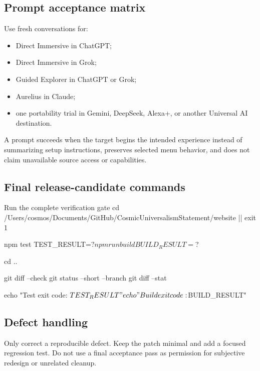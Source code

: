 \documentclass[11pt,letterpaper]{article}
\begin{document}
\subsection{Prompt acceptance matrix}

Use fresh conversations for:

\begin{itemize}
    \item Direct Immersive in ChatGPT;
    \item Direct Immersive in Grok;
    \item Guided Explorer in ChatGPT or Grok;
    \item Aurelius in Claude;
    \item one portability trial in Gemini, DeepSeek, Alexa+, or another
          Universal AI destination.
\end{itemize}

A prompt succeeds when the target begins the intended experience instead of
summarizing setup instructions, preserves selected menu behavior, and does not
claim unavailable source access or capabilities.

\subsection{Final release-candidate commands}

\begin{commandbox}{Run the complete verification gate}
cd /Users/cosmos/Documents/GitHub/CosmicUniversalismStatement/website || exit 1

npm test
TEST_RESULT=$?

npm run build
BUILD_RESULT=$?

cd ..

git diff --check
git status --short --branch
git diff --stat

echo "Test exit code:  $TEST_RESULT"
echo "Build exit code: $BUILD_RESULT"
\end{commandbox}

\subsection{Defect handling}

Only correct a reproducible defect. Keep the patch minimal and add a focused
regression test. Do not use a final acceptance pass as permission for subjective
redesign or unrelated cleanup.

\end{document}
